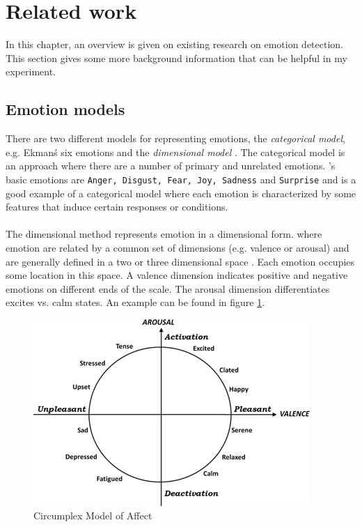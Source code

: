 \documentclass[11pt]{article}
\begin{document}
\section{Related work}
In this chapter, an overview is given on existing research on emotion detection. This section gives some more background information that can be helpful in my experiment.

\subsection{Emotion models}
There are two different models for representing emotions, the \textit{categorical model}, e.g. Ekman\'s six emotions\cite{ekman1992argument} and the \textit{dimensional model} \cite{russell2003core}. The categorical model is an approach where there are a number of primary and unrelated emotions. 's basic emotions are \texttt{Anger, Disgust, Fear, Joy, Sadness} and \texttt{Surprise} and is a good example of a categorical model where each emotion is characterized by some features that induce certain responses  or conditions. \\\\
The dimensional method represents emotion in a dimensional form. where emotion are related by a common set of dimensions (e.g. valence or arousal) and are generally defined in a two or three dimensional space \cite{mohammad2015sentiment}. Each emotion occupies some location in this space. A valence dimension indicates positive and negative emotions on different ends of the scale. The arousal dimension differentiates excites vs. calm states. An example can be found in figure \ref{fig:circumplex}.

\begin{figure}[ht]
  \includegraphics[width=\linewidth]{5425219.jpg}
  \caption{Circumplex Model of Affect}
  \label{fig:circumplex}
\end{figure}
\end{document}
